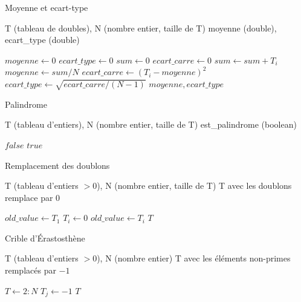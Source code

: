 \documentclass[a4paper]{article}
\DeclarePairedDelimiter\floor{\lfloor}{\rfloor}
\theoremstyle{definition}
\begin{document}
\begin{algorithm}[h!]
    \caption{Moyenne et ecart-type}\label{alg:cap}
    \Entree T (tableau de doubles), N (nombre entier, taille de T)
    \Sortie moyenne (double), ecart\_type (double)
    \begin{algorithmic}[1]
    \State $moyenne \gets 0$
    \State $ ecart\_type \gets 0$
    \State $sum \gets 0$
    \State $ecart\_carre \gets 0$
    \State $sum \gets sum + T_i$
    \EndFor
    \State $moyenne \gets sum/N$
    \State $ecart\_carre \gets (T_i - moyenne)^2$
    \EndFor
    \State $ecart\_type \gets \sqrt{ecart\_carre/(N-1)}$
    \State \Return $moyenne, ecart\_type$
    \end{algorithmic}
\end{algorithm}
\newpage
\begin{algorithm}[t!]
    \caption{Palindrome}\label{alg:cap}
    \Entree T (tableau d'entiers), N (nombre entier, taille de T)
    \Sortie est\_palindrome (boolean)
    \begin{algorithmic}[1]
    \State \Return $false$
    \EndIf
    \EndFor
    \State \Return $true$
    \end{algorithmic}
\end{algorithm}

\begin{algorithm}[t!]
    \caption{Remplacement des doublons}\label{alg:cap}
    \Entree T (tableau d'entiers $> 0$), N (nombre entier, taille de T)
    \Sortie T avec les doublons remplace par 0
    \begin{algorithmic}[1]
    \State $old\_value \gets T_1$
    \State $T_i \gets 0$
    \Else
    \State $old\_value \gets T_i$
    \EndIf
    \EndFor
    \State \Return $T$
    \end{algorithmic}
\end{algorithm}

\setcounter{algorithm}{6}
\begin{algorithm}[h!]
    \caption{Crible d'\'Erastosth\`ene}\label{alg:cap}
    \Entree T (tableau d'entiers $> 0$), N (nombre entier)
    \Sortie T avec les \'el\'ements non-primes remplac\'es par $-1$
    \begin{algorithmic}[1]
    \State $T \gets 2:N$
    \State $T_j \gets -1$
    \EndIf
    \EndFor
    \EndFor
    \State \Return $T$
    \end{algorithmic}
\end{algorithm}
\newpage
\end{document}

